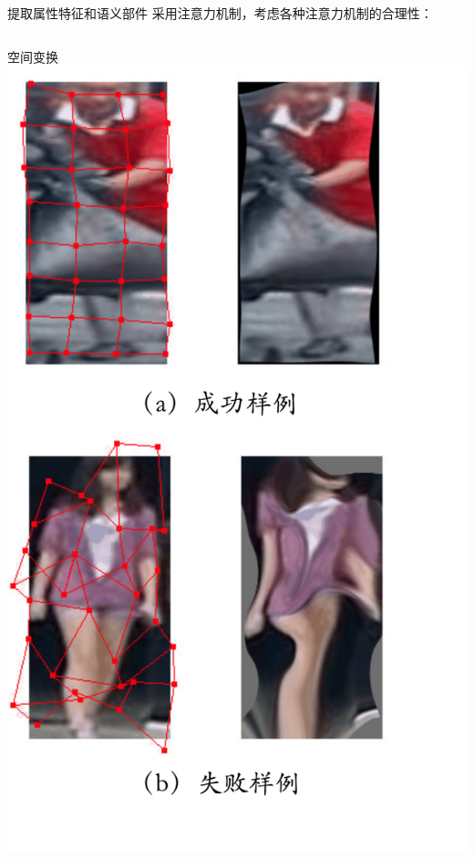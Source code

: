 \documentclass[usenames,dvipsnames,notes]{beamer}
\begin{document}
\begin{frame}{提取属性特征和语义部件}
	采用注意力机制，考虑各种注意力机制的合理性：
	\begin{columns}
		空间变换 \\
		\includegraphics[width=\textwidth]{fig/stn.pdf}


\end{columns}
\end{frame}
\end{document}
